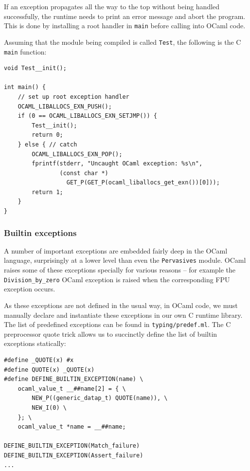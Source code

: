 \documentclass[12pt,a4paper,twoside,openright]{report}
\begin{document}
If an exception propagates all the way to the top without being handled
successfully, the runtime needs to print an error message and abort the
program. This is done by installing a root handler in \lstinline!main! before
calling into OCaml code.

Assuming that the module being compiled is called \lstinline!Test!, the
following is the C \lstinline!main! function:

\begin{lstlisting}
void Test__init();

int main() {
    // set up root exception handler
    OCAML_LIBALLOCS_EXN_PUSH();
    if (0 == OCAML_LIBALLOCS_EXN_SETJMP()) {
        Test__init();
        return 0;
    } else { // catch
        OCAML_LIBALLOCS_EXN_POP();
        fprintf(stderr, "Uncaught OCaml exception: %s\n",
                (const char *)
                  GET_P(GET_P(ocaml_liballocs_get_exn())[0]));
        return 1;
    }
}
\end{lstlisting}

\subsubsection{Builtin exceptions}\label{builtin-exceptions}

A number of important exceptions are embedded fairly deep in the OCaml
language, surprisingly at a lower level than even the \lstinline!Pervasives!
module. OCaml raises some of these exceptions specially for various reasons --
for example the \lstinline!Division_by_zero! OCaml exception is raised when the
corresponding FPU exception occurs.

As these exceptions are not defined in the usual way, in OCaml code, we must
manually declare and instantiate these exceptions in our own C runtime library.
The list of predefined exceptions can be found in \lstinline!typing/predef.ml!.
The C preprocessor quote trick allows us to succinctly define the list of
builtin exceptions statically:

\begin{lstlisting}
#define _QUOTE(x) #x
#define QUOTE(x) _QUOTE(x)
#define DEFINE_BUILTIN_EXCEPTION(name) \
    ocaml_value_t __##name[2] = { \
        NEW_P((generic_datap_t) QUOTE(name)), \
        NEW_I(0) \
    }; \
    ocaml_value_t *name = __##name;

DEFINE_BUILTIN_EXCEPTION(Match_failure)
DEFINE_BUILTIN_EXCEPTION(Assert_failure)
...
\end{lstlisting}
\end{document}
